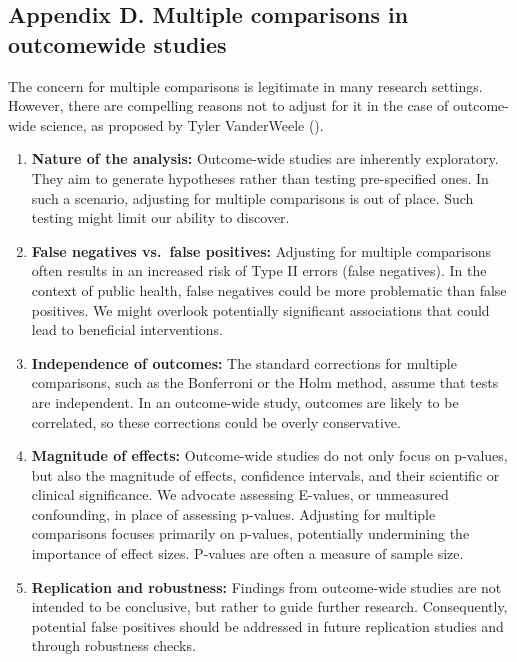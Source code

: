 \documentclass[
  singlecolumn,
  9pt]{scrartcl}
\begin{document}
\newpage{}

\subsection{Appendix D. Multiple comparisons in outcomewide
studies}\label{appendix-d.-multiple-comparisons-in-outcomewide-studies}

The concern for multiple comparisons is legitimate in many research
settings. However, there are compelling reasons not to adjust for it in
the case of outcome-wide science, as proposed by Tyler VanderWeele
().

\begin{enumerate}
\def\labelenumi{\arabic{enumi}.}
\item
  \textbf{Nature of the analysis:} Outcome-wide studies are inherently
  exploratory. They aim to generate hypotheses rather than testing
  pre-specified ones. In such a scenario, adjusting for multiple
  comparisons is out of place. Such testing might limit our ability to
  discover.
\item
  \textbf{False negatives vs.~false positives:} Adjusting for multiple
  comparisons often results in an increased risk of Type II errors
  (false negatives). In the context of public health, false negatives
  could be more problematic than false positives. We might overlook
  potentially significant associations that could lead to beneficial
  interventions.
\item
  \textbf{Independence of outcomes:} The standard corrections for
  multiple comparisons, such as the Bonferroni or the Holm method,
  assume that tests are independent. In an outcome-wide study, outcomes
  are likely to be correlated, so these corrections could be overly
  conservative.
\item
  \textbf{Magnitude of effects:} Outcome-wide studies do not only focus
  on p-values, but also the magnitude of effects, confidence intervals,
  and their scientific or clinical significance. We advocate assessing
  E-values, or unmeasured confounding, in place of assessing p-values.
  Adjusting for multiple comparisons focuses primarily on p-values,
  potentially undermining the importance of effect sizes. P-values are
  often a measure of sample size.
\item
  \textbf{Replication and robustness:} Findings from outcome-wide
  studies are not intended to be conclusive, but rather to guide further
  research. Consequently, potential false positives should be addressed
  in future replication studies and through robustness checks.
\end{enumerate}
\end{document}
